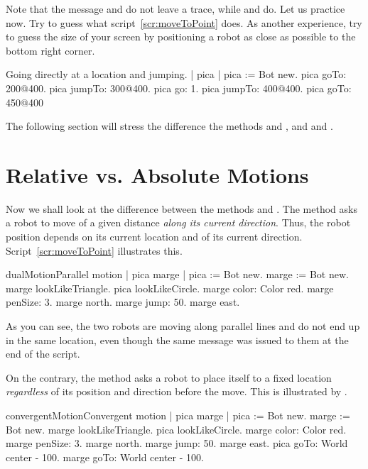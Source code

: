 Note that the message  and  do not leave a trace, while and  do. Let us practice now. Try to guess what script~\ref{scr:moveToPoint} does.
As another experience, try to guess the size of your screen by positioning a robot as close as possible to the bottom right corner. 

\begin{scriptwithtitle}{Going directly at a location and jumping.}\label{scr:moveToPoint}
| pica  |
pica := Bot new.
pica goTo: 200@400.
pica jumpTo: 300@400.
pica go: 1.
pica jumpTo: 400@400.
pica goTo: 450@400
\end{scriptwithtitle}

The following section will stress the difference the methods  and , and  and .


\section{Relative vs. Absolute Motions}
Now we shall look at the difference between the methods   and . The method  asks a robot to move of a given distance \emph{along its current direction}. Thus, the robot position depends on its current location and of its current direction. Script~\ref{scr:moveToPoint} illustrates this.

\begin{scriptfig}{dualMotion}{Parallel motion}
\label{scr:dualMotion}
| pica marge |
pica := Bot new.
marge := Bot new.
marge lookLikeTriangle.
pica lookLikeCircle.
marge color: Color red.
marge penSize: 3.
marge north.
marge jump: 50.
marge east.
\end{scriptfig}

As you can see, the two robots are moving along parallel lines and
do not end up in the same location, even though the same message
 was issued to them at the end of the script.

On the contrary, the method  asks a robot to place itself
to a fixed location \emph{regardless} of its position and direction
before the move. This is illustrated by
.

\begin{scriptfig}{convergentMotion}{Convergent motion}
\label{scr:convergentMotion}
| pica marge |
pica := Bot new.
marge := Bot new.
marge lookLikeTriangle.
pica lookLikeCircle.
marge color: Color red.
marge penSize: 3.
marge north.
marge jump: 50.
marge east.
pica goTo: World center - 100.
marge goTo: World center - 100. 
\end{scriptfig}

